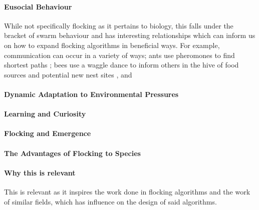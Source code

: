 	\paragraph{Eusocial Behaviour}
	While not specifically flocking as it pertains to biology, this falls under the bracket of swarm behaviour and has interesting relationships which can inform us on how to expand flocking algorithms in beneficial ways. For example, communication can occur in a variety of ways; ants use pheromones to find shortest paths \citep{DORIGO199773}; bees use a waggle dance to inform others in the hive of food sources and potential new nest sites \citep{AlToufailia2013}, and %
	
	\paragraph{Dynamic Adaptation to Environmental Pressures}
	
	\paragraph{Learning and Curiosity}

	\paragraph{Flocking and Emergence}
	
	\paragraph{The Advantages of Flocking to Species} %
	
	\paragraph{Why this is relevant}
	This is relevant as it inspires the work done in flocking algorithms and the work of similar fields, which has influence on the design of said algorithms. 


